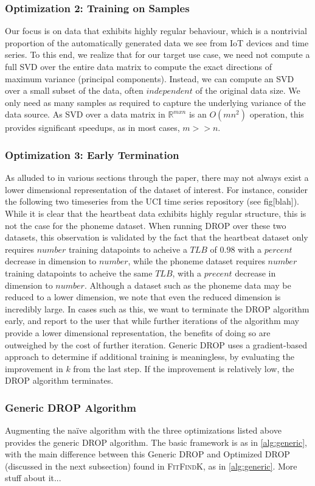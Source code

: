 \subsubsection{Optimization 2: Training on Samples}
Our focus is on data that exhibits highly regular behaviour, which is a nontrivial proportion of the automatically generated data we see from IoT devices and time series. 
To this end, we realize that for our target use case, we need not compute a full SVD over the entire data matrix to compute the exact directions of maximum variance (principal components). 
Instead, we can compute an SVD over a small subset of the data, often $independent$ of the original data size. 
We only need as many samples as required to capture the underlying variance of the data source. As SVD over a data matrix in $\mathbb{R}^{mxn}$ is an $O(mn^2)$ operation, this provides significant speedups, as in most cases, $m >> n$. 

\subsubsection{Optimization 3: Early Termination}
As alluded to in various sections through the paper, there may not always exist a lower dimensional representation of the dataset of interest.
For instance, consider the following two timeseries from the UCI time series repository (see fig[blah]). While it is clear that the heartbeat data exhibits highly regular structure, this is not the case for the phoneme dataset. 
When running DROP over these two datasets, this observation is validated by the fact that the heartbeat dataset only requires $number$ training datapoints to acheive a $TLB$ of $0.98$ with a $percent$ decrease in dimension to $number$, while the phoneme dataset requires $number$ training datapoints to acheive the same $TLB$, with a $precent$ decrease in dimension to $number$.
Although a dataset such as the phoneme data may be reduced to a lower dimension, we note that even the reduced dimension is incredibly large. In cases such as this, we want to terminate the DROP algorithm early, and report to the user that while further iterations of the algorithm may provide a lower dimensional representation, the benefits of doing so are outweighed by the cost of further iteration. Generic DROP uses a gradient-based approach to determine if additional training is meaningless, by evaluating the improvement in $k$ from the last step. If the improvement is relatively low, the DROP algorithm terminates. 

\subsubsection{Generic DROP Algorithm}
Augmenting the na{\"i}ve algorithm with the three optimizations listed above provides the generic DROP algorithm. The basic framework is as in \ref{alg:generic}, with the main difference between this Generic DROP and Optimized DROP (discussed in the next subsection) found in \textsc{FitFindK}, as in \ref{alg:generic}. More stuff about it...


